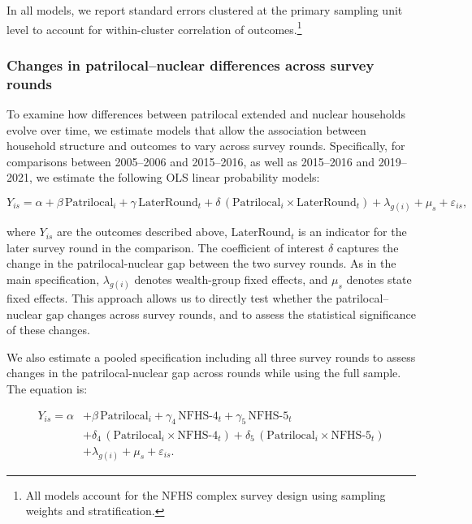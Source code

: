 \documentclass[10pt,twoside,reqno]{article}
\begin{document}
In all models, we report standard errors clustered at the primary sampling unit level to account for within-cluster correlation of outcomes.\footnote{All models account for the NFHS complex survey design using sampling weights and stratification.}

\subsubsection*{Changes in patrilocal–nuclear differences across survey rounds}

To examine how differences between patrilocal extended and nuclear households evolve over time, we estimate models that allow the association between household structure and outcomes to vary across survey rounds. Specifically, for comparisons between 2005--2006 and 2015--2016, as well as 2015--2016 and 2019--2021, we estimate the following OLS linear probability models:

\begin{equation} \label{eq:tworounds}
Y_{is} = \alpha + \beta \,\text{Patrilocal}_i + \gamma \,\text{LaterRound}_t
+ \delta \,(\text{Patrilocal}_i \times \text{LaterRound}_t)
+ \lambda_{g(i)} + \mu_s + \varepsilon_{is},
\end{equation}


where $Y_{is}$ are the outcomes described above, $\text{LaterRound}_t$ is an indicator for the later survey round in the comparison. The coefficient of interest $\delta$ captures the change in the patrilocal-nuclear gap between the two survey rounds. As in the main specification, $\lambda_{g(i)}$ denotes wealth-group fixed effects, and $\mu_s$ denotes state fixed effects. This approach allows us to directly test whether the patrilocal–nuclear gap changes across survey rounds, and to assess the statistical significance of these changes.

We also estimate a pooled specification including all three survey rounds to assess changes in the patrilocal-nuclear gap across rounds while using the full sample. The equation is:

\begin{equation} \label{eq:stacked}
\begin{aligned}
Y_{is} = \alpha 
&+ \beta \,\text{Patrilocal}_i
+ \gamma_4 \,\text{NFHS-4}_t
+ \gamma_5 \,\text{NFHS-5}_t \\
&+ \delta_4 \,(\text{Patrilocal}_i \times \text{NFHS-4}_t)
+ \delta_5 \,(\text{Patrilocal}_i \times \text{NFHS-5}_t) \\
&+ \lambda_{g(i)} + \mu_s + \varepsilon_{is}.
\end{aligned}
\end{equation}
\end{document}
